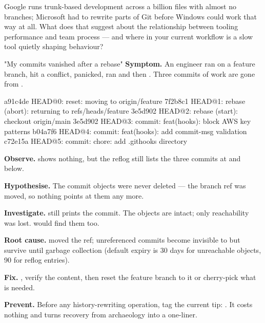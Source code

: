 \begin{thinkbox}
Google runs trunk-based development across a billion files with almost no branches; Microsoft had to rewrite parts of Git before Windows could work that way at all. What does that suggest about the relationship between tooling performance and team process --- and where in your current workflow is a slow tool quietly shaping behaviour?
\end{thinkbox}


\begin{debuglab}{"My commits vanished after a rebase"}
\textbf{Symptom.} An engineer ran  on a feature branch, hit a conflict, panicked, ran  and then . Three commits of work are gone from .

\begin{outbox}
a91c4de HEAD@{0}: reset: moving to origin/feature
7f2b8c1 HEAD@{1}: rebase (abort): returning to refs/heads/feature
3e5d902 HEAD@{2}: rebase (start): checkout origin/main
3e5d902 HEAD@{3}: commit: feat(hooks): block AWS key patterns
b04a7f6 HEAD@{4}: commit: feat(hooks): add commit-msg validation
c72e15a HEAD@{5}: commit: chore: add .githooks directory
\end{outbox}

\begin{tickcheck}
  \item \textbf{Observe.}  shows nothing, but the reflog still lists the three commits at  and below.
  \item \textbf{Hypothesise.} The commit objects were never deleted --- the branch ref was moved, so nothing points at them any more.
  \item \textbf{Investigate.}  still prints the commit. The objects are intact; only reachability was lost.  would find them too.
  \item \textbf{Root cause.}  moved the ref; unreferenced commits become invisible to  but survive until garbage collection (default expiry is 30 days for unreachable objects, 90 for reflog entries).
  \item \textbf{Fix.} , verify the content, then reset the feature branch to it or cherry-pick what is needed.
  \item \textbf{Prevent.} Before any history-rewriting operation, tag the current tip: . It costs nothing and turns recovery from archaeology into a one-liner.
\end{tickcheck}
\end{debuglab}

